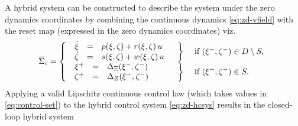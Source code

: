 A hybrid system can be constructed to describe the system under the zero
dynamics coordinates by combining the continuous dynamics \eqref{eq:zd-vfield}
with the reset map (expressed in the zero dynamics coordinates) viz.
% 
\begin{align}
  \label{eq:zd-hcsys}
  \HCSbar= \left\{
    \begin{array}{l c l}
      \begin{array}{r c l}
        {\dot \zdx} &=& \rff\argsxz + \rfg\argsxz \, \uu\\
        {\dot \zdz} &=& \rfq\argsxz + \rfw\argsxz \, \uu
      \end{array} &
      \left.\vphantom{
          \begin{array}{r c l}
            {\dot \zdx} &=& \rff\argsxz + \rfg\argsxz \, \uu\\
            {\dot \zdz} &=& \rfq\argsxz + \rfw\argsxz \, \uu
          \end{array}}\right\} & \mbox{ if } \argsxzm \in \D \setminus \Guard,\\
      \begin{array}{r c l}
        \zdx^{+} &=& \DeltaX(\zdx^{-}, \zdz^{-})\\
        \zdz^{+} &=& \DeltaZ(\zdx^{-}, \zdz^{-})
      \end{array}
      & \left.\vphantom{\begin{array}{r c l}
            \zdx^{+} &=& \DeltaX(\zdx^{-}, \zdz^{-})\\
            \zdz^{+} &=& \DeltaZ(\zdx^{-}, \zdz^{-})
          \end{array}}\right\}
      & \mbox{ if } \argsxzm \in \Guard.
    \end{array}\right.
\end{align}
% 
Applying a valid Lipschitz continuous control law (which takes values in
\eqref{eq:control-set}) to the hybrid control system \eqref{eq:zd-hcsys} results
in the closed-loop hybrid system
% 
